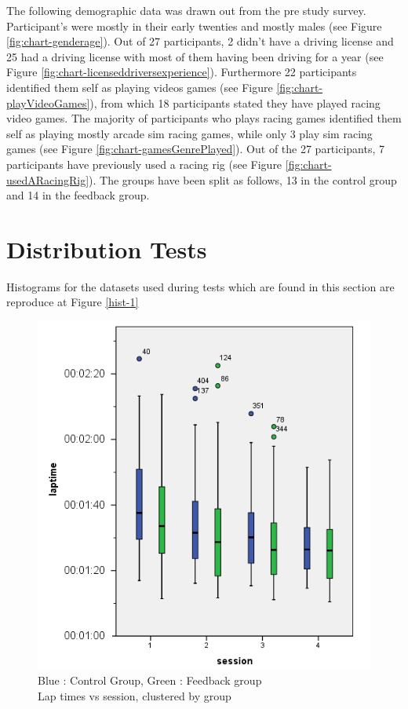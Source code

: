 The following demographic data was drawn out from the pre study survey. Participant's were mostly in their early twenties and mostly males (see Figure \ref{fig:chart-genderage}). Out of 27 participants, 2 didn't have a driving license and 25 had a driving license with most of them having been driving for a year (see Figure \ref{fig:chart-licenseddriversexperience}). Furthermore 22 participants identified them self as playing videos games (see Figure \ref{fig:chart-playVideoGames}), from which 18 participants stated they have played racing video games. The majority of participants who plays racing games identified them self as playing mostly arcade sim racing games, while only 3 play sim racing games (see Figure \ref{fig:chart-gamesGenrePlayed}). Out of the 27 participants, 7 participants have previously used a racing rig (see Figure \ref{fig:chart-usedARacingRig}). The groups have been split as follows, 13 in the control group and 14 in the feedback group.

\section{Distribution Tests}
\label{sec:eval-distTests}

Histograms for the datasets used during tests which are found in this section are reproduce at Figure \ref{hist-1}

\begin{figure}[!htb]
	\centering
	\includegraphics[width=\textwidth]{charts/laptimes.png}
	\caption[Lap times vs session, clustered by group]{Blue : Control Group, Green : Feedback group \\ Lap times vs session, clustered by group}
	\label{fig:chart-laptimes}
\end{figure}

